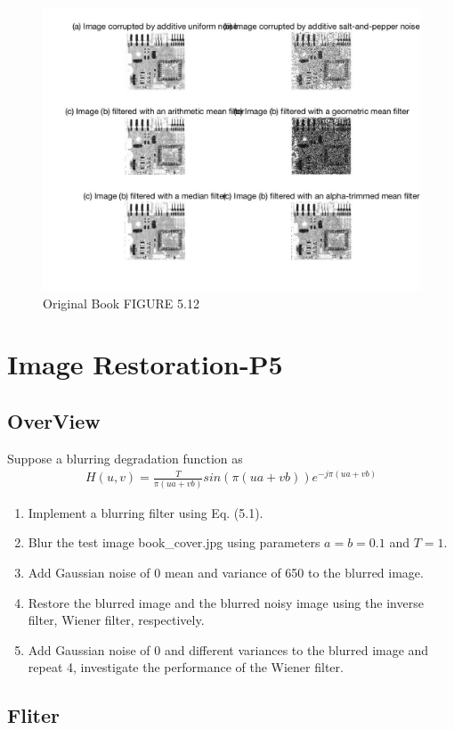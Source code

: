 \documentclass[11pt,oneside]{book}
\begin{document}
\begin{figure}[!htb]
   \centering  
   \includegraphics[width=1.0\textwidth]{images/4/order3.jpg}
   \caption{Original Book FIGURE 5.12}
\end{figure}
\newpage
\chapter{Image Restoration-P5}
\section{OverView}
Suppose a blurring degradation function as
\begin{align}
H(u,v) = \frac{T}{\pi(ua+vb)}sin(\pi(ua+vb))e^{-j\pi(ua+vb)}
\end{align}
\begin{enumerate}
	\item Implement a blurring filter using Eq. (5.1).
	\item Blur the test image book\_cover.jpg using parameters $a=b=0.1$ and $T = 1$.
	\item Add Gaussian noise of 0 mean and variance of 650 to the blurred image.
	\item Restore the blurred image and the blurred noisy image using the inverse filter, Wiener filter, respectively.
	\item Add Gaussian noise of 0 and different variances to the blurred image and repeat 4, investigate the performance of the Wiener filter.
\end{enumerate}
\section{Fliter}
\end{document}
